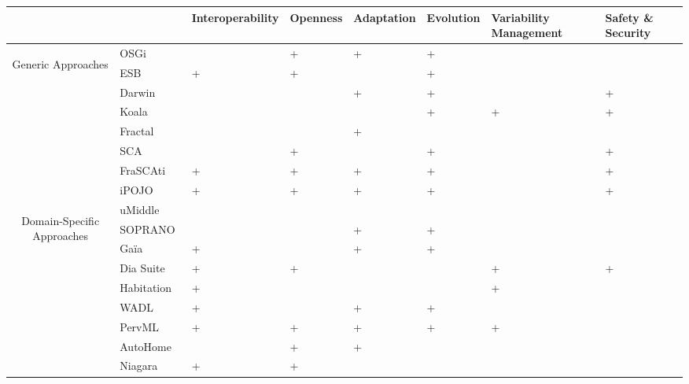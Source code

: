 \begin{table}[h!]
\begin{tabular}{cm{}|| >{\centering\arraybackslash}m{}| >{\centering\arraybackslash}m{}| >{\centering\arraybackslash}m{}| >{\centering\arraybackslash}m{}| >{\centering}m{}| >{\centering\arraybackslash}m{}|}
 & & {\tiny Interoperability} & {\tiny Openness} & {\tiny Adaptation} & {\tiny Evolution} & {\tiny Variability Management} & {\tiny Safety \& Security}\\
 \hline\hline
 \multirow{7}{8mm}{\begin{sideways}\parbox{25mm}{\small\centering Generic Approaches}\end{sideways}}
 &{\small OSGi~\cite{OSGI:r4}}				&  & + & + & + &  &  \\ 
 &{\small ESB}								& + & + &  & + &  &  \\
 \cline{2-8}%
 &{\small Darwin~\cite{Georgiadis:2002}}		&  &  & + & + &   & + \\ 
 &{\small Koala~\cite{RobVanOmmering:2000}}	&  &  &   & + & + & + \\
 &{\small Fractal~\cite{Bruneton:2006}}		&  &  & + &   &   &  \\
 \cline{2-8}%
 &{\small SCA~\cite{sca:specs}}				&   & + &  & + &  & +\\
 &{\small FraSCAti~\cite{Melisson:2010}}	 	& + & + & + & + &  & + \\
 &{\small iPOJO~\cite{Escoffier:2007}}		& + & + & + & + &  & + \\
 \hline\hline
 \multirow{9}{8mm}{\begin{sideways}\parbox{30mm}{\small\centering  Domain-Specific Approaches}\end{sideways}} 
 &{\small uMiddle~\cite{Nakazawa:2007}}		&  &  &  &  &  &  \\
 &{\small SOPRANO~\cite{Wolf:2010}}			&  &  & + & + &  &  \\
 &{\small Ga\"ia~\cite{Roman:2002}}			& + &  & + & + &  &  \\
 &{\small Dia Suite~\cite{CASSOU:2010}}		& + & + &  &  & + & + \\
 &{\small Habitation~\cite{Jimenez:2009}}	& + &  &  &  & + &  \\
 &{\small WADL~\cite{Cervantes:2008}}		& + &  & + & + &  &  \\
 &{\small PervML~\cite{Munoz:2006a}}			& + & + & + & + & + &  \\
 &{\small AutoHome~\cite{Bourcier:2011}}		&  & + & + &  &  &  \\
 &{\small Niagara}							& + & + &  &  &  &  \\
 \hline
\end{tabular}


\end{table}
